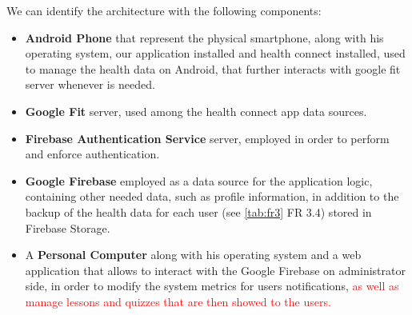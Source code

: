 \noindent We can identify the architecture with the following components:
\vspace{3ex}
\begin{itemize}[nosep] %
    \item \textbf{Android Phone} that represent the physical smartphone, along with his operating system, our application installed and health connect installed, used to manage the health data on Android, that further interacts with google fit server whenever is needed.
    \item \textbf{Google Fit} server, used among the health connect app data sources.
    \item \textbf{Firebase Authentication Service} server, employed in order to perform and enforce authentication.
    \item \textbf{Google Firebase} employed as a data source for the application logic, containing other needed data, such as profile information, in addition to the backup of the health data for each user (see \cref{tab:fr3} FR 3.4) stored in Firebase Storage.
    \item A \textbf{Personal Computer} along with his operating system and a web application that allows to interact with the Google Firebase on administrator side, in order to modify the system metrics for users notifications, \textcolor{red}{as well as manage lessons and quizzes that are then showed to the users.}  
\end{itemize}

